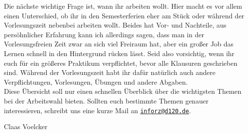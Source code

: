 {    Die nächste wichtige Frage ist, wann ihr arbeiten wollt. Hier macht es vor allem einen Unterschied, ob ihr in den Semesterferien eher am Stück oder während der Vorlesungszeit nebenbei arbeiten wollt. Beides hat Vor- und Nachteile, aus persöhnlicher Erfahrung kann ich allerdings sagen, dass man in der Vorlesungsfreien Zeit zwar an sich viel Freiraum hat, aber ein großer Job das Lernen schnell in den Hintergrund rücken lässt. Seid also vorsichtig, wenn ihr euch für ein größeres Praktikum verpflichtet, bevor alle Klausuren geschrieben sind. Während der Vorlesungszeit habt ihr dafür natürlich auch andere Verpflichtungen, Vorlesungen, Übungen und andere Abgaben. \\

    Diese Übersicht soll nur einen schnellen Überblick über die wichtigsten
    Themen bei der Arbeitswahl bieten. Sollten euch bestimmte Themen genauer
    interessieren, schreibt uns eine kurze Mail an
    \texttt{\href{mailto:inforz@d120.de}{inforz@d120.de}}.

}
{Claas Voelcker}
\vfill
{}
